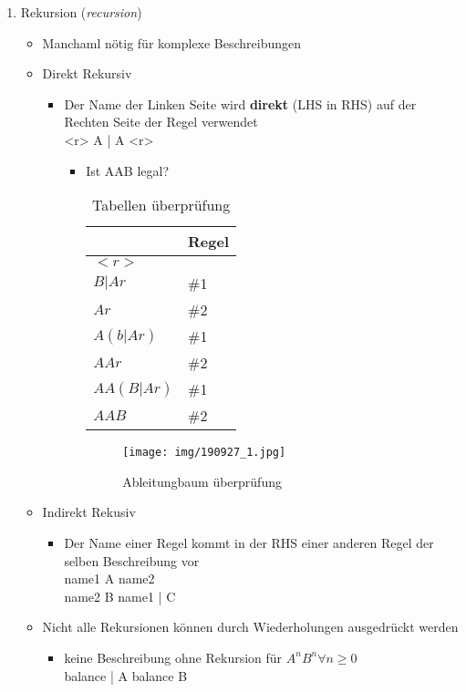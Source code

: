 \documentclass[11pt]{article}
\begin{document}
\begin{enumerate}
\item Rekursion (\emph{recursion})
\label{sec:orgcb225cd}
\begin{itemize}
\item Manchaml nötig für komplexe Beschreibungen\\
\item Direkt Rekursiv\\
\begin{itemize}
\item Der Name der Linken Seite wird \textbf{direkt} (LHS in RHS) auf der Rechten Seite der Regel verwendet\\
<r> \Leftarrow A | A <r>

\begin{itemize}
\item Ist AAB legal?\\
\begin{table}[htbp]
\caption{Tabellen überprüfung}
\centering
\begin{tabular}{ll}
 & Regel\\
\hline
\(<r>\) & \\
\(B \vert Ar\) & \#1\\
\(Ar\) & \#2\\
\(A(b \vert Ar)\) & \#1\\
\(AAr\) & \#2\\
\(AA(B\vert Ar)\) & \#1\\
\(AAB\) & \#2\\
\end{tabular}
\end{table}

\begin{figure}[htbp]
\centering
\texttt{[image: img/190927\_1.jpg]}
\caption{Ableitungbaum überprüfung}
\end{figure}
\end{itemize}
\end{itemize}
\item Indirekt Rekusiv\\
\begin{itemize}
\item Der Name einer Regel kommt in der RHS einer anderen Regel der selben Beschreibung vor\\
name1 \Leftarrow A name2\\
name2 \Leftarrow B name1 | C\\
\end{itemize}

\item Nicht alle Rekursionen können durch Wiederholungen ausgedrückt werden\\
\begin{itemize}
\item keine  Beschreibung ohne Rekursion für \(A^n B^n \forall n \geq 0\)\\
balance \Leftarrow | A balance B


\end{itemize}
\end{itemize}
\end{enumerate}
\end{document}
